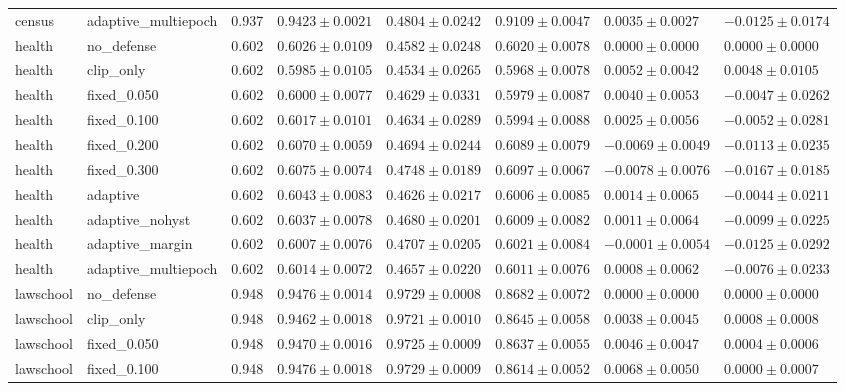 \begin{table}[!t]
{\begin{tabular}{llllllll}
census & adaptive\_multiepoch & 0.937 & $0.9423\pm0.0021$ & $0.4804\pm0.0242$ & $0.9109\pm0.0047$ & $0.0035\pm0.0027$ & $-0.0125\pm0.0174$ \\
health & no\_defense & 0.602 & $0.6026\pm0.0109$ & $0.4582\pm0.0248$ & $0.6020\pm0.0078$ & $0.0000\pm0.0000$ & $0.0000\pm0.0000$ \\
health & clip\_only & 0.602 & $0.5985\pm0.0105$ & $0.4534\pm0.0265$ & $0.5968\pm0.0078$ & $0.0052\pm0.0042$ & $0.0048\pm0.0105$ \\
health & fixed\_0.050 & 0.602 & $0.6000\pm0.0077$ & $0.4629\pm0.0331$ & $0.5979\pm0.0087$ & $0.0040\pm0.0053$ & $-0.0047\pm0.0262$ \\
health & fixed\_0.100 & 0.602 & $0.6017\pm0.0101$ & $0.4634\pm0.0289$ & $0.5994\pm0.0088$ & $0.0025\pm0.0056$ & $-0.0052\pm0.0281$ \\
health & fixed\_0.200 & 0.602 & $0.6070\pm0.0059$ & $0.4694\pm0.0244$ & $0.6089\pm0.0079$ & $-0.0069\pm0.0049$ & $-0.0113\pm0.0235$ \\
health & fixed\_0.300 & 0.602 & $0.6075\pm0.0074$ & $0.4748\pm0.0189$ & $0.6097\pm0.0067$ & $-0.0078\pm0.0076$ & $-0.0167\pm0.0185$ \\
health & adaptive & 0.602 & $0.6043\pm0.0083$ & $0.4626\pm0.0217$ & $0.6006\pm0.0085$ & $0.0014\pm0.0065$ & $-0.0044\pm0.0211$ \\
health & adaptive\_nohyst & 0.602 & $0.6037\pm0.0078$ & $0.4680\pm0.0201$ & $0.6009\pm0.0082$ & $0.0011\pm0.0064$ & $-0.0099\pm0.0225$ \\
health & adaptive\_margin & 0.602 & $0.6007\pm0.0076$ & $0.4707\pm0.0205$ & $0.6021\pm0.0084$ & $-0.0001\pm0.0054$ & $-0.0125\pm0.0292$ \\
health & adaptive\_multiepoch & 0.602 & $0.6014\pm0.0072$ & $0.4657\pm0.0220$ & $0.6011\pm0.0076$ & $0.0008\pm0.0062$ & $-0.0076\pm0.0233$ \\
lawschool & no\_defense & 0.948 & $0.9476\pm0.0014$ & $0.9729\pm0.0008$ & $0.8682\pm0.0072$ & $0.0000\pm0.0000$ & $0.0000\pm0.0000$ \\
lawschool & clip\_only & 0.948 & $0.9462\pm0.0018$ & $0.9721\pm0.0010$ & $0.8645\pm0.0058$ & $0.0038\pm0.0045$ & $0.0008\pm0.0008$ \\
lawschool & fixed\_0.050 & 0.948 & $0.9470\pm0.0016$ & $0.9725\pm0.0009$ & $0.8637\pm0.0055$ & $0.0046\pm0.0047$ & $0.0004\pm0.0006$ \\
lawschool & fixed\_0.100 & 0.948 & $0.9476\pm0.0018$ & $0.9729\pm0.0009$ & $0.8614\pm0.0052$ & $0.0068\pm0.0050$ & $0.0000\pm0.0007$ \\

\end{tabular}}
\end{table}
